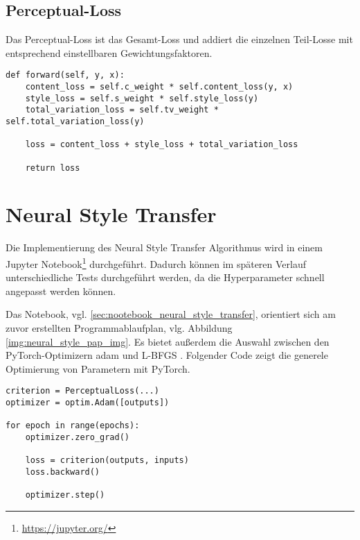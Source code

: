 \subsection{Perceptual-Loss}

Das Perceptual-Loss ist das Gesamt-Loss und addiert die einzelnen Teil-Losse mit entsprechend einstellbaren Gewichtungsfaktoren.

\begin{listing}[H]
\begin{verbatim}
def forward(self, y, x):
    content_loss = self.c_weight * self.content_loss(y, x)
    style_loss = self.s_weight * self.style_loss(y)
    total_variation_loss = self.tv_weight * self.total_variation_loss(y)

    loss = content_loss + style_loss + total_variation_loss

    return loss
\end{verbatim}
\end{listing}

\section{Neural Style Transfer}

Die Implementierung des Neural Style Transfer Algorithmus wird in einem Jupyter Notebook\footnote{\url{https://jupyter.org/}} durchgeführt. 
Dadurch können im späteren Verlauf unterschiedliche Tests durchgeführt werden, da die Hyperparameter schnell angepasst werden können.

Das Notebook, vgl. \ref{sec:nootebook_neural_style_transfer}, orientiert sich am zuvor erstellten Programmablaufplan, vlg. Abbildung \ref{img:neural_style_pap_img}. Es bietet außerdem die Auswahl zwischen den PyTorch-Optimizern \gls{adam} und L-BFGS \cite{Liu1989}. Folgender Code zeigt die  generele Optimierung von Parametern mit PyTorch.

\begin{listing}[H]
\begin{verbatim}
criterion = PerceptualLoss(...)
optimizer = optim.Adam([outputs])

for epoch in range(epochs):
    optimizer.zero_grad()

    loss = criterion(outputs, inputs)
    loss.backward()

    optimizer.step()    
\end{verbatim}
\end{listing}

